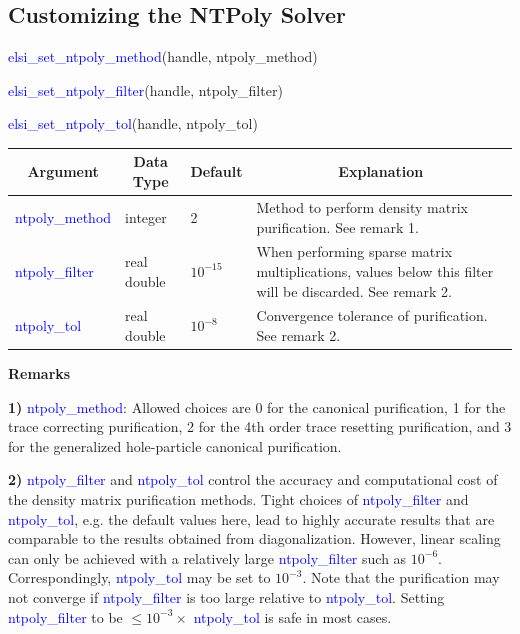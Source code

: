 \documentclass{report}
\begin{document}
\subsection{Customizing the NTPoly Solver}
\label{subsec:setter_ntpoly}
\begin{labeling}{\hspace{6cm}}
\item [\hspace{0.3cm} \textcolor{blue}{elsi\_set\_ntpoly\_method}(handle, ntpoly\_method)]
\item [\hspace{0.3cm} \textcolor{blue}{elsi\_set\_ntpoly\_filter}(handle, ntpoly\_filter)]
\item [\hspace{0.3cm} \textcolor{blue}{elsi\_set\_ntpoly\_tol}(handle, ntpoly\_tol)]
\end{labeling}

\begin{tabular}[]{|p{30mm}|p{20mm}|p{15mm}|p{100mm}|}
\hline
\multicolumn{1}{|c|}{\textbf{Argument}} & \multicolumn{1}{c|}{\textbf{Data Type}} & \multicolumn{1}{c|}{\textbf{Default}} & \multicolumn{1}{c|}{\textbf{Explanation}}\\
\hline
\textcolor{blue}{ntpoly\_method} & integer     & 2          & Method to perform density matrix purification. See remark 1.\\
\hline
\textcolor{blue}{ntpoly\_filter} & real double & $10^{-15}$ & When performing sparse matrix multiplications, values below this filter will be discarded. See remark 2.\\
\hline
\textcolor{blue}{ntpoly\_tol}    & real double & $10^{-8}$  & Convergence tolerance of purification. See remark 2.\\
\hline
\end{tabular}

\textbf{Remarks}

\textbf{1)} \textcolor{blue}{ntpoly\_method}: Allowed choices are 0 for the canonical purification, 1 for the trace correcting purification, 2 for the 4th order trace resetting purification, and 3 for the generalized hole-particle canonical purification.

\textbf{2)} \textcolor{blue}{ntpoly\_filter} and \textcolor{blue}{ntpoly\_tol} control the accuracy and computational cost of the density matrix purification methods. Tight choices of \textcolor{blue}{ntpoly\_filter} and \textcolor{blue}{ntpoly\_tol}, e.g. the default values here, lead to highly accurate results that are comparable to the results obtained from diagonalization. However, linear scaling can only be achieved with a relatively large \textcolor{blue}{ntpoly\_filter} such as $10^{-6}$. Correspondingly, \textcolor{blue}{ntpoly\_tol} may be set to $10^{-3}$. Note that the purification may not converge if \textcolor{blue}{ntpoly\_filter} is too large relative to \textcolor{blue}{ntpoly\_tol}. Setting \textcolor{blue}{ntpoly\_filter} to be $\le 10^{-3} \times $ \textcolor{blue}{ntpoly\_tol} is safe in most cases.
\end{document}
